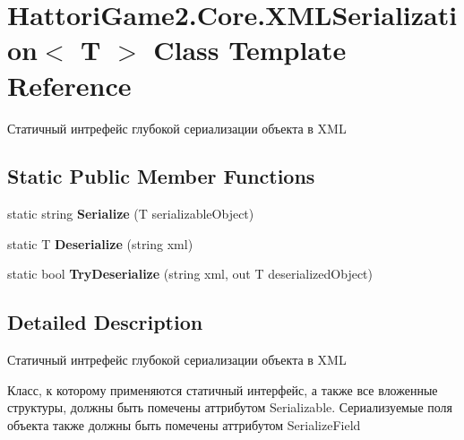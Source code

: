 \hypertarget{class_hattori_game2_1_1_core_1_1_x_m_l_serialization}{}\section{Hattori\+Game2.\+Core.\+X\+M\+L\+Serialization$<$ T $>$ Class Template Reference}
\label{class_hattori_game2_1_1_core_1_1_x_m_l_serialization}


Статичный интрефейс глубокой сериализации объекта в X\+M\+L  


\subsection*{Static Public Member Functions}
\begin{DoxyCompactItemize}
\item 
\hypertarget{class_hattori_game2_1_1_core_1_1_x_m_l_serialization_ac83c063d51307636d0a7810b42618098}{}static string {\bfseries Serialize} (T serializable\+Object)\label{class_hattori_game2_1_1_core_1_1_x_m_l_serialization_ac83c063d51307636d0a7810b42618098}

\item 
\hypertarget{class_hattori_game2_1_1_core_1_1_x_m_l_serialization_a4f53832cc038b5d36ef68a0179f65eab}{}static T {\bfseries Deserialize} (string xml)\label{class_hattori_game2_1_1_core_1_1_x_m_l_serialization_a4f53832cc038b5d36ef68a0179f65eab}

\item 
\hypertarget{class_hattori_game2_1_1_core_1_1_x_m_l_serialization_a7a8b040c752da36c6b23c45fe75ef8a4}{}static bool {\bfseries Try\+Deserialize} (string xml, out T deserialized\+Object)\label{class_hattori_game2_1_1_core_1_1_x_m_l_serialization_a7a8b040c752da36c6b23c45fe75ef8a4}

\end{DoxyCompactItemize}


\subsection{Detailed Description}
Статичный интрефейс глубокой сериализации объекта в X\+M\+L 

Класс, к которому применяются статичный интерфейс, а также все вложенные структуры, должны быть помечены аттрибутом {\ttfamily Serializable}. Сериализуемые поля объекта также должны быть помечены аттрибутом {\ttfamily Serialize\+Field}

